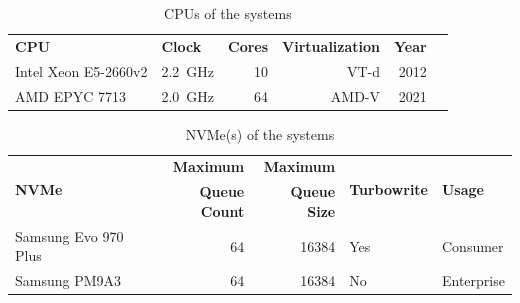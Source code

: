 \begin{table}
    \centering
    \begin{tabular}{llrrrr}
        \multirow{2}{*}{\textbf{CPU}} & \multirow{2}{*}{\textbf{Clock}} & \multirow{2}{*}{\textbf{Cores}} & \multirow{2}{*}{\textbf{Virtualization}} & \multirow{2}{*}{\textbf{Year}}
        \\
                                      &                                 &                                 &                                          &                                \\
        \toprule

        Intel Xeon E5-2660v2          & \qty{2.2}{\giga\Hz}             & 10                              & VT-d                                     & 2012                           \\
        AMD EPYC 7713                 & \qty{2.0}{\giga\Hz}             & 64                              & AMD-V                                    & 2021                           \\

        \bottomrule
    \end{tabular}

    \caption{CPUs of the systems}
    \label{tab:cpus}
\end{table}

\begin{table}
    \centering
    \begin{tabular}{lrrll}
        \multirow{2}{*}{\textbf{NVMe}} & \textbf{Maximum}     & \textbf{Maximum}    & \multirow{2}{*}{\textbf{Turbowrite}} & \multirow{2}{*}{\textbf{Usage}} \\
                                       & \textbf{Queue Count} & \textbf{Queue Size} &                                      &                                 \\
        \toprule

        Samsung Evo 970 Plus           & 64                   & 16384               & Yes                                  & Consumer                        \\
        Samsung PM9A3                  & 64                   & 16384               & No                                   & Enterprise                      \\

        \bottomrule
    \end{tabular}

    \caption{NVMe(s) of the systems}
    \label{tab:nvmes}
\end{table}

